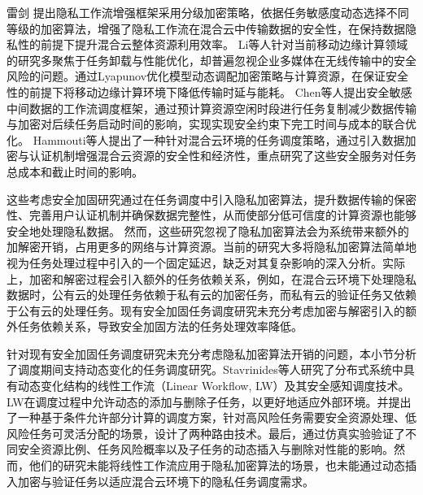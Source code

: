 雷剑\cite{leiHunheYunHuanjing2023} 提出隐私工作流增强框架采用分级加密策略，依据任务敏感度动态选择不同等级的加密算法，增强了隐私工作流在混合云中传输数据的安全性，在保持数据隐私性的前提下提升混合云整体资源利用效率。
Li等人\cite{liSecurityPerformanceawareResource2020}针对当前移动边缘计算领域的研究多聚焦于任务卸载与性能优化，却普遍忽视企业多媒体在无线传输中的安全风险的问题。通过Lyapunov优化模型动态调配加密策略与计算资源，在保证安全性的前提下将移动边缘计算环境下降低传输时延与能耗。
Chen等人\cite{chenSchedulingWorkflowsSecuritySensitive2017}提出安全敏感中间数据的工作流调度框架，通过预计算资源空闲时段进行任务复制减少数据传输与加密对后续任务启动时间的影响，实现实现安全约束下完工时间与成本的联合优化。
Hammouti等人\cite{hammoutiWorkflowSecurityScheduling2021}提出了一种针对混合云环境的任务调度策略，通过引入数据加密与认证机制增强混合云资源的安全性和经济性，重点研究了这些安全服务对任务总成本和截止时间的影响。

这些考虑安全加固研究通过在任务调度中引入隐私加密算法，提升数据传输的保密性、完善用户认证机制并确保数据完整性，从而使部分低可信度的计算资源也能够安全地处理隐私数据。
然而，这些研究忽视了隐私加密算法会为系统带来额外的加解密开销，占用更多的网络与计算资源。当前的研究大多将隐私加密算法简单地视为任务处理过程中引入的一个固定延迟\cite{leiHunheYunHuanjing2023, hammoutiWorkflowSecurityScheduling2021}，缺乏对其复杂影响的深入分析。实际上，加密和解密过程会引入额外的任务依赖关系，例如，在混合云环境下处理隐私数据时，公有云的处理任务依赖于私有云的加密任务，而私有云的验证任务又依赖于公有云的处理任务。现有安全加固任务调度研究未充分考虑加密与解密引入的额外任务依赖关系，导致安全加固方法的任务处理效率降低。


针对现有安全加固任务调度研究未充分考虑隐私加密算法开销的问题，本小节分析了调度期间支持动态变化的任务调度研究。Stavrinides等人研究了分布式系统中具有动态变化结构的线性工作流\cite{stavrinidesSchedulingLinearWorkflows2023, stavrinidesMulticriteriaSchedulingLinear2021}（Linear Workflow, LW）及其安全感知调度技术\cite{stavrinidesSecurityAwareOrchestrationLinear2022}。LW在调度过程中允许动态的添加与删除子任务，以更好地适应外部环境。并提出了一种基于条件允许部分计算的调度方案，针对高风险任务需要安全资源处理、低风险任务可灵活分配的场景，设计了两种路由技术。最后，通过仿真实验验证了不同安全资源比例、任务风险概率以及子任务的动态插入与删除对性能的影响。然而，他们的研究未能将线性工作流应用于隐私加密算法的场景，也未能通过动态插入加密与验证任务以适应混合云环境下的隐私任务调度需求。

